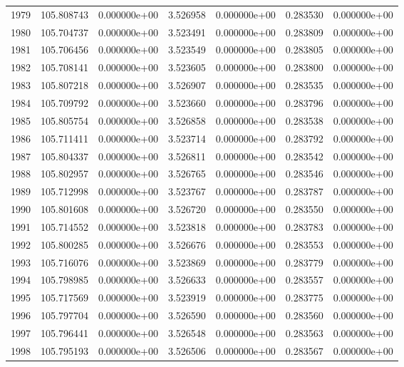 \begin{tabular}{rrrrrrr}
1979 & 105.808743 &  0.000000e+00 &  3.526958 &  0.000000e+00 &    0.283530 &  0.000000e+00 \\
1980 & 105.704737 &  0.000000e+00 &  3.523491 &  0.000000e+00 &    0.283809 &  0.000000e+00 \\
1981 & 105.706456 &  0.000000e+00 &  3.523549 &  0.000000e+00 &    0.283805 &  0.000000e+00 \\
1982 & 105.708141 &  0.000000e+00 &  3.523605 &  0.000000e+00 &    0.283800 &  0.000000e+00 \\
1983 & 105.807218 &  0.000000e+00 &  3.526907 &  0.000000e+00 &    0.283535 &  0.000000e+00 \\
1984 & 105.709792 &  0.000000e+00 &  3.523660 &  0.000000e+00 &    0.283796 &  0.000000e+00 \\
1985 & 105.805754 &  0.000000e+00 &  3.526858 &  0.000000e+00 &    0.283538 &  0.000000e+00 \\
1986 & 105.711411 &  0.000000e+00 &  3.523714 &  0.000000e+00 &    0.283792 &  0.000000e+00 \\
1987 & 105.804337 &  0.000000e+00 &  3.526811 &  0.000000e+00 &    0.283542 &  0.000000e+00 \\
1988 & 105.802957 &  0.000000e+00 &  3.526765 &  0.000000e+00 &    0.283546 &  0.000000e+00 \\
1989 & 105.712998 &  0.000000e+00 &  3.523767 &  0.000000e+00 &    0.283787 &  0.000000e+00 \\
1990 & 105.801608 &  0.000000e+00 &  3.526720 &  0.000000e+00 &    0.283550 &  0.000000e+00 \\
1991 & 105.714552 &  0.000000e+00 &  3.523818 &  0.000000e+00 &    0.283783 &  0.000000e+00 \\
1992 & 105.800285 &  0.000000e+00 &  3.526676 &  0.000000e+00 &    0.283553 &  0.000000e+00 \\
1993 & 105.716076 &  0.000000e+00 &  3.523869 &  0.000000e+00 &    0.283779 &  0.000000e+00 \\
1994 & 105.798985 &  0.000000e+00 &  3.526633 &  0.000000e+00 &    0.283557 &  0.000000e+00 \\
1995 & 105.717569 &  0.000000e+00 &  3.523919 &  0.000000e+00 &    0.283775 &  0.000000e+00 \\
1996 & 105.797704 &  0.000000e+00 &  3.526590 &  0.000000e+00 &    0.283560 &  0.000000e+00 \\
1997 & 105.796441 &  0.000000e+00 &  3.526548 &  0.000000e+00 &    0.283563 &  0.000000e+00 \\
1998 & 105.795193 &  0.000000e+00 &  3.526506 &  0.000000e+00 &    0.283567 &  0.000000e+00 \\

\end{tabular}
